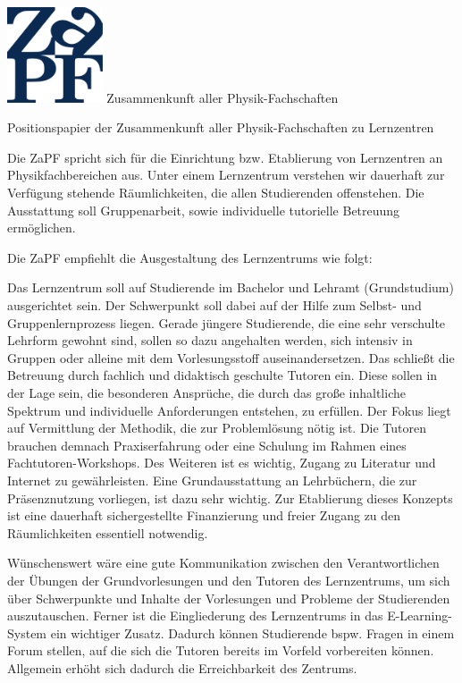 \documentclass[DIV=calc]{scrartcl}
\begin{document}
\hspace{0.87\textwidth}
\begin{minipage}{120pt}
\vspace{-1.8cm}
\includegraphics[width=80pt]{logo.pdf}
\centering
\small Zusammenkunft aller Physik-Fachschaften
\end{minipage}
\begin{center}
\huge{Positionspapier der Zusammenkunft aller Physik-Fachschaften zu Lernzentren} \\
\normalsize
\end{center}

Die ZaPF spricht sich für die Einrichtung bzw. Etablierung von Lernzentren an Physikfachbereichen aus.
Unter einem Lernzentrum verstehen wir dauerhaft zur Verfügung stehende Räumlichkeiten, die allen Studierenden offenstehen. Die Ausstattung soll Gruppenarbeit, sowie individuelle tutorielle Betreuung ermöglichen.

Die ZaPF empfiehlt die Ausgestaltung des Lernzentrums wie folgt:

Das Lernzentrum soll auf Studierende im Bachelor und Lehramt (Grundstudium) ausgerichtet sein. Der Schwerpunkt soll dabei auf der Hilfe zum Selbst- und Gruppenlernprozess liegen.
Gerade jüngere Studierende, die eine sehr verschulte Lehrform gewohnt sind, sollen so dazu angehalten werden, sich intensiv in Gruppen oder alleine mit dem Vorlesungsstoff  auseinandersetzen. 
Das schließt die Betreuung durch fachlich und didaktisch geschulte Tutoren ein. Diese sollen in der Lage sein, die besonderen Ansprüche, die durch das große inhaltliche Spektrum und individuelle Anforderungen entstehen, zu erfüllen. Der Fokus liegt auf Vermittlung der Methodik, die zur Problemlösung nötig ist. Die Tutoren brauchen demnach Praxiserfahrung oder eine Schulung im Rahmen eines Fachtutoren-Workshops.
Des Weiteren ist es wichtig, Zugang zu Literatur und Internet zu gewährleisten. Eine Grundausstattung an Lehrbüchern, die zur Präsenznutzung vorliegen, ist dazu sehr wichtig.
Zur Etablierung dieses Konzepts ist eine dauerhaft sichergestellte Finanzierung und freier Zugang zu den Räumlichkeiten essentiell notwendig.

Wünschenswert wäre eine gute Kommunikation zwischen den Verantwortlichen der Übungen der Grundvorlesungen und den Tutoren des Lernzentrums, um sich über Schwerpunkte und Inhalte der Vorlesungen und Probleme der Studierenden auszutauschen.
Ferner ist die Eingliederung des Lernzentrums in das E-Learning-System ein wichtiger Zusatz. Dadurch können Studierende bspw. Fragen in einem Forum stellen, auf die sich die Tutoren bereits im Vorfeld vorbereiten können. Allgemein erhöht sich dadurch die Erreichbarkeit des Zentrums.
\end{document}
